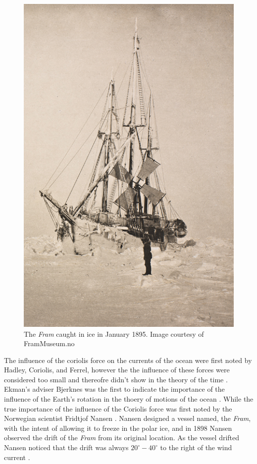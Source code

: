 \begin{figure}
  \includegraphics[scale=0.35]{Figures/Fram.jpg}
  \caption{The \emph{Fram} caught in ice in January 1895. Image courtesy of
  FramMuseum.no}
  \label{fig:Fram}
\end{figure}
The influence of the coriolis force on the currents of the ocean were first
noted by Hadley, Coriolis, and Ferrel, however the the influence of these forces
were considered too small and thereofre didn't show in the theory of the time
\cite{Ekman1905}. Ekman's adviser Bjerknes was the first to indicate the
importance of the influence of the Earth's rotation in the thoery of motions of
the ocean \cite{Ekman1905}. While the true importance of the influence of the
Coriolis force was first noted by the Norwegian scientist Fridtjof Nansen
\cite{Beesley2008, Ekman1905}. Nansen designed a vessel named, the \emph{Fram},
with the intent of allowing it to freeze in the polar ice, and in 1898 Nansen
observed the drift of the \emph{Fram} from its original location. As the vessel
drifted Nansen noticed that the drift was always $20^\circ - 40^\circ$ to the
right of the wind current \cite{Beesley2008}.

